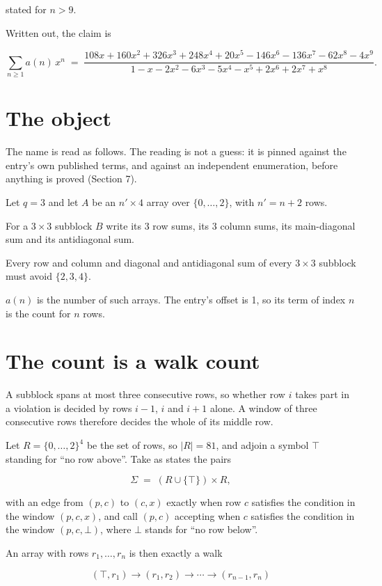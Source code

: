 \documentclass[11pt]{article}
\theoremstyle{definition}
\begin{document}
stated for $n > 9$.

Written out, the claim is

\[\sum_{n \ge 1} a(n)\,x^n \;=\; \frac{108x + 160x^{2} + 326x^{3} + 248x^{4} + 20x^{5} - 146x^{6} - 136x^{7} - 62x^{8} - 4x^{9}}{1 - x - 2x^{2} - 6x^{3} - 5x^{4} - x^{5} + 2x^{6} + 2x^{7} + x^{8}}.\]

\section{The object}

The name is read as follows. The reading is not a guess: it is pinned against the entry's own published terms, and against an independent enumeration, before anything is proved (Section 7).

Let $q = 3$ and let $A$ be an $n' \times 4$ array over $\{0,\dots,2\}$, with $n' = n + 2$ rows.

For a $3\times3$ subblock $B$ write its 3 row sums, its 3 column sums, its main-diagonal sum and its antidiagonal sum.

Every row and column and diagonal and antidiagonal sum of every $3\times3$ subblock must avoid $\{2, 3, 4\}$.

$a(n)$ is the number of such arrays. The entry's offset is 1, so its term of index $n$ is the count for $n$ rows.

\section{The count is a walk count}

A subblock spans at most three consecutive rows, so whether row $i$ takes part in a violation is decided by rows $i-1$, $i$ and $i+1$ alone. A window of three consecutive rows therefore decides the whole of its middle row.

Let $R = \{0,\dots,2\}^{4}$ be the set of rows, so $|R| = 81$, and adjoin a symbol $\top$ standing for ``no row above''. Take as states the pairs

\[\Sigma \;=\; (R \cup \{\top\}) \times R,\]

with an edge from $(p,c)$ to $(c,x)$ exactly when row $c$ satisfies the condition in the window $(p,c,x)$, and call $(p,c)$ accepting when $c$ satisfies the condition in the window $(p,c,\bot)$, where $\bot$ stands for ``no row below''.

An array with rows $r_1,\dots,r_n$ is then exactly a walk

\[(\top,r_1) \to (r_1,r_2) \to \cdots \to (r_{n-1},r_n)\]
\end{document}
